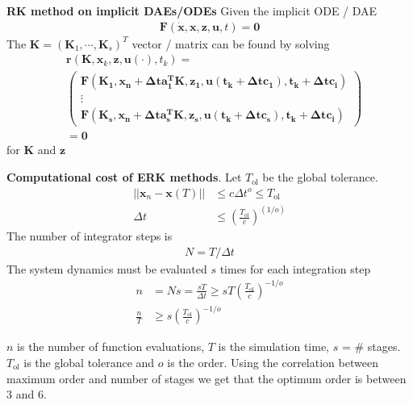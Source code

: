 \textbf{RK method on implicit DAEs/ODEs}
Given the implicit ODE / DAE
\begin{align*}
    \bm{F}(\dot{\bm{x}},\bm{x},\bm{z},\bm{u},t) = \bm{0}
\end{align*}
The \(\bm{K}=(\bm{K}_1,\cdots,\bm{K}_s)^T\) vector / matrix can be found by solving
\begin{align*}
    & \bm{r}(\bm{K},\bm{x}_k,\bm{z},\bm{u}(\cdot),t_k) = \\ 
    & \begin{pmatrix}
        \bm{F(\bm{K}_1,\bm{x}_n+\Delta t\bm{a}_1^T\bm{K},\bm{z}_1,\bm{u}(t_k+\Delta t c_1),t_k+\Delta t c_i)} \\ \vdots \\
        \bm{F(\bm{K}_s,\bm{x}_n+\Delta t\bm{a}_s^T\bm{K},\bm{z}_s,\bm{u}(t_k+\Delta t c_s),t_k+\Delta t c_i)}
    \end{pmatrix} \\ &= \bm{0}
\end{align*}
for \(\bm{K}\) and \(\bm{z}\)
\newline

\textbf{Computational cost of ERK methods}. Let \(T_\textrm{ol}\) be the global tolerance. 
\begin{align*}
    ||\bm{x}_n-\bm{x}(T)|| &\leq c\Delta t^o\leq T_\textrm{ol} \\
    \Delta t &\leq \left(\frac{T_\textrm{ol}}{c}\right)^{(1/o)}
\end{align*}
The number of integrator steps is
\begin{align*}
    N = T/{\Delta t}
\end{align*}
The system dynamics must be evaluated \(s\) times for each integration step
\begin{align*}
    n &= Ns = \frac{sT}{\Delta t} \geq sT\left(\frac{T_\textrm{ol}}{c}\right)^{-1/o} \\
    \frac{n}{T} &\geq s\left(\frac{T_{\textrm{ol}}}{c}\right)^{-1/o}
\end{align*}

\(n\) is the number of function evaluations, \(T\) is the simulation time, \(s\) = \(\#\) stages. \(T_\textrm{ol}\) is the global tolerance and \(o\) is the order. Using the correlation between maximum order and number of stages we get that the optimum order is between 3 and 6.

